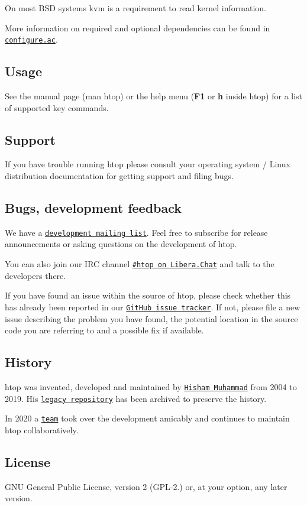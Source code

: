 On most B\+SD systems {\ttfamily kvm} is a requirement to read kernel information.

More information on required and optional dependencies can be found in \href{configure.ac}{\tt configure.\+ac}.

\subsection*{Usage}

See the manual page ({\ttfamily man htop}) or the help menu ({\bfseries F1} or {\bfseries h} inside {\ttfamily htop}) for a list of supported key commands.

\subsection*{Support}

If you have trouble running {\ttfamily htop} please consult your operating system / Linux distribution documentation for getting support and filing bugs.

\subsection*{Bugs, development feedback}

We have a \href{https://htop.dev/mailinglist.html}{\tt development mailing list}. Feel free to subscribe for release announcements or asking questions on the development of {\ttfamily htop}.

You can also join our I\+RC channel \href{https://web.libera.chat/#htop}{\tt \#htop on Libera.\+Chat} and talk to the developers there.

If you have found an issue within the source of {\ttfamily htop}, please check whether this has already been reported in our \href{https://github.com/htop-dev/htop/issues}{\tt Git\+Hub issue tracker}. If not, please file a new issue describing the problem you have found, the potential location in the source code you are referring to and a possible fix if available.

\subsection*{History}

{\ttfamily htop} was invented, developed and maintained by \href{https://hisham.hm/}{\tt Hisham Muhammad} from 2004 to 2019. His \href{https://github.com/hishamhm/htop/}{\tt legacy repository} has been archived to preserve the history.

In 2020 a \href{https://github.com/orgs/htop-dev/people}{\tt team} took over the development amicably and continues to maintain {\ttfamily htop} collaboratively.

\subsection*{License}

G\+NU General Public License, version 2 (G\+P\+L-\/2.) or, at your option, any later version. 